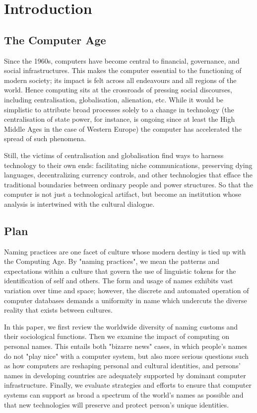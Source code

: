 \section{Introduction}

\subsection{The Computer Age}

Since the 1960s, computers have become central to financial, governance, and
social infrastructures. This makes the computer essential to the functioning of
modern society; its impact is felt across all endeavours and all regions of the
world. Hence computing sits at the crossroads of pressing social discourses,
including centralisation, globalisation, alienation, etc. While it would be
simplistic to attribute broad processes solely to a change in technology (the
centralisation of state power, for instance, is ongoing since at least the High
Middle Ages in the case of Western Europe) the computer has accelerated the
spread of such phenomena.

Still, the victims of centralisation and globalisation find ways to harness
technology to their own ends: facilitating niche communications, preserving
dying languages, decentralizing currency controls, and other technologies that
efface the traditional boundaries between ordinary people and power structures.
So that the computer is not just a technological artifact, but become an
institution whose analysis is intertwined with the cultural dialogue.

\subsection{Plan}

Naming practices are one facet of culture whose modern destiny is tied up
with the Computing Age. By "naming practices", we mean the patterns and
expectations within a culture that govern the use of linguistic tokens for the
identification of self and others. The form and usage of names exhibits vast
variation over time and space; however, the discrete and automated operation of
computer databases demands a uniformity in name which undercuts the diverse
reality that exists between cultures.

In this paper, we first review the worldwide diversity of naming customs and
their sociological functions. Then we examine the impact of computing on
personal names. This entails both "bizarre news" cases, in which people's names
do not "play nice" with a computer system, but also more serious questions such
as how computers are reshaping personal and cultural identities, and persons'
names in developing countries are adequately supported by dominant computer
infrastructure. Finally, we evaluate strategies and efforts to ensure that
computer systems can support as broad a spectrum of the world's names as
possible and that new technologies will preserve and protect person's unique
identities.
